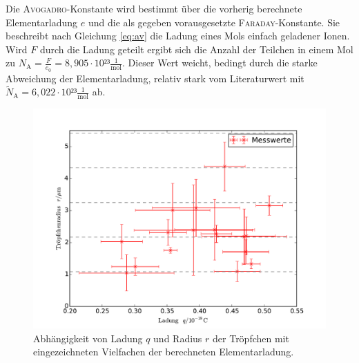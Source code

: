 Die \textsc{Avogadro}-Konstante wird bestimmt über die vorherig berechnete Elementarladung $e$ und die als gegeben vorausgesetzte \textsc{Faraday}-Konstante. Sie beschreibt nach Gleichung \eqref{eq:av} die Ladung eines Mols einfach geladener Ionen. Wird $F$ durch die Ladung geteilt ergibt sich die Anzahl der Teilchen in einem Mol zu $N_\mathup{A}=\frac{F}{e_0}=8,905\cdot10²³\frac{1}{\si\mol}$. Dieser Wert weicht, bedingt durch die starke Abweichung der Elementarladung, relativ stark vom Literaturwert \cite{texas_instruments3} mit $\tilde{N}_\mathup{A}=6,022\cdot10²³\frac{1}{\si\mol}$ ab.
\begin{figure}
	\centering
	\includegraphics[width=\textwidth]{Bilder/plot_messwerte+.pdf}
	\caption{Abhängigkeit von Ladung $q$ und Radius $r$ der Tröpfchen mit eingezeichneten Vielfachen der berechneten Elementarladung.}
	\label{fig:label1}
\end{figure}